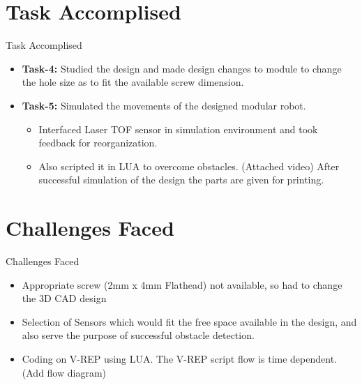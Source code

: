 \documentclass[10pt, a4paper]{beamer}
\begin{document}
\section{Task Accomplised}
\begin{frame}{Task Accomplised}
	\begin{itemize}
		

		\item  \textbf{Task-4:}  Studied the design and made design changes to module to change the hole size as to fit the available screw dimension. \linebreak

		\item \textbf{Task-5:}  Simulated the movements of the designed modular robot.
		\begin{itemize}
		
		
\item Interfaced Laser TOF sensor in simulation environment and took feedback for reorganization.                                                                                                                              \item Also scripted it in LUA to overcome obstacles. (Attached video)
        \linebreak After successful simulation of the design the parts are given for printing.
        \end{itemize}

		
	\end{itemize}
\end{frame}



\section{Challenges Faced}
\begin{frame}{Challenges Faced}
	\begin{itemize}
		\item Appropriate screw (2mm x 4mm Flathead) not available, so had to change the 3D CAD design
		\item Selection of Sensors which would fit the free space available in the design, and also serve the purpose of successful obstacle detection.

		\item Coding on V-REP using LUA. The V-REP script flow is time dependent. (Add flow diagram)

 
	\end{itemize}
\end{frame}
\end{document}
